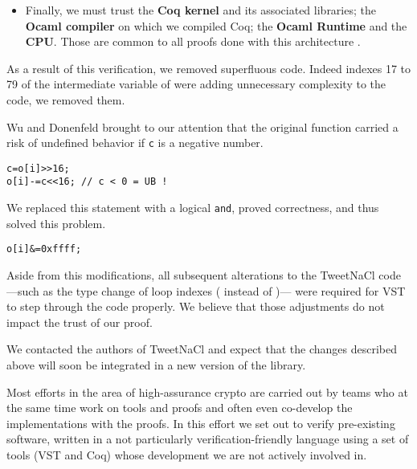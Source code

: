 \begin{itemize}
      \item Finally, we must trust the \textbf{Coq kernel} and its
            associated libraries; the \textbf{Ocaml compiler} on which we compiled Coq;
            the \textbf{Ocaml Runtime} and the \textbf{CPU}. Those are common to all proofs
            done with this architecture \cite{2015-Appel,coq-faq}.
\end{itemize}

As a result of this verification, we removed superfluous code.
Indeed indexes 17 to 79 of the  intermediate variable of
 were adding unnecessary complexity to the code,
we removed them.

Wu and Donenfeld brought to our attention that the original
 function carried a risk of undefined behavior if \texttt{c}
is a negative number.
\begin{lstlisting}[language=Ctweetnacl,stepnumber=0]
c=o[i]>>16;
o[i]-=c<<16; // c < 0 = UB !
\end{lstlisting}
We replaced this statement with a logical \texttt{and}, proved correctness,
and thus solved this problem.
\begin{lstlisting}[language=Ctweetnacl,stepnumber=0]
o[i]&=0xffff;
\end{lstlisting}

Aside from this modifications, all subsequent alterations to the TweetNaCl code%
---such as the type change of loop indexes ( instead of )---%
were required for VST to step through the code properly. We believe that those
adjustments do not impact the trust of our proof.

We contacted the authors of TweetNaCl and expect that the changes described
above will soon be integrated in a new version of the library.




Most efforts in the area of high-assurance crypto are carried out
by teams who at the same time work on tools and proofs and often
even co-develop the implementations with the proofs.
In this effort we set out to verify pre-existing software,
written in a not particularly verification-friendly language
using a set of tools (VST and Coq) whose development we are not
actively involved in.

